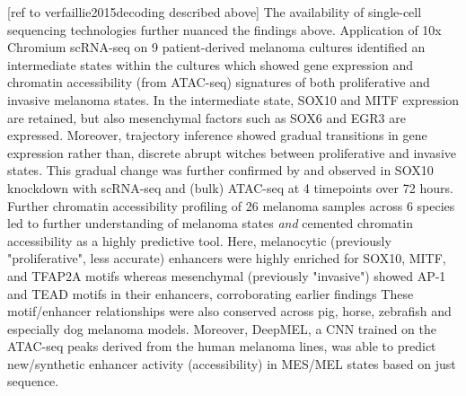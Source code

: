 	[ref to verfaillie2015decoding described above] The availability of single-cell sequencing technologies further nuanced the findings above. Application of 10x Chromium scRNA-seq on 9 patient-derived melanoma cultures identified an intermediate states within the cultures which showed gene expression and chromatin accessibility (from ATAC-seq) signatures of both proliferative and invasive melanoma states. In the intermediate state, SOX10 and MITF expression are retained, but also mesenchymal factors such as SOX6 and EGR3 are expressed. Moreover, trajectory inference showed gradual transitions in gene expression rather than, discrete abrupt witches between proliferative and invasive states. This gradual change was further confirmed by and observed in SOX10 knockdown with scRNA-seq and (bulk) ATAC-seq at 4 timepoints over 72 hours. Further chromatin accessibility profiling of 26 melanoma samples across 6 species led to further understanding of melanoma states \textit{and} cemented chromatin accessibility as a highly predictive tool. Here, melanocytic (previously "proliferative", less accurate) enhancers were highly enriched for SOX10, MITF, and TFAP2A motifs whereas mesenchymal (previously "invasive") showed AP-1 and TEAD motifs in their enhancers, corroborating earlier findings These motif/enhancer relationships were also conserved across pig, horse, zebrafish and especially dog melanoma models. Moreover, DeepMEL, a CNN trained on the ATAC-seq peaks derived from the human melanoma lines, was able to predict new/synthetic enhancer activity (accessibility) in MES/MEL states based on just sequence.




